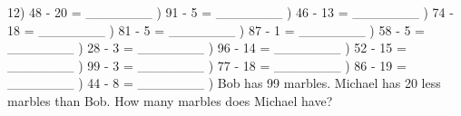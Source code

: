 \documentclass{article}%
\begin{document}
12) 48 {-} 20 = \_\_\_\_\_\_\_%
\newline%
\newline%
) 91 {-} 5 = \_\_\_\_\_\_\_%
\newline%
\newline%
) 46 {-} 13 = \_\_\_\_\_\_\_%
\newline%
\newline%
) 74 {-} 18 = \_\_\_\_\_\_\_%
\newline%
\newline%
) 81 {-} 5 = \_\_\_\_\_\_\_%
\newline%
\newline%
) 87 {-} 1 = \_\_\_\_\_\_\_%
\newline%
\newline%
) 58 {-} 5 = \_\_\_\_\_\_\_%
\newline%
\newline%
) 28 {-} 3 = \_\_\_\_\_\_\_%
\newline%
\newline%
) 96 {-} 14 = \_\_\_\_\_\_\_%
\newline%
\newline%
) 52 {-} 15 = \_\_\_\_\_\_\_%
\newline%
\newline%
) 99 {-} 3 = \_\_\_\_\_\_\_%
\newline%
\newline%
) 77 {-} 18 = \_\_\_\_\_\_\_%
\newline%
\newline%
) 86 {-} 19 = \_\_\_\_\_\_\_%
\newline%
\newline%
) 44 {-} 8 = \_\_\_\_\_\_\_%
\newline%
\newline%
) Bob has 99 marbles. Michael has 20 less marbles than Bob. How many marbles does Michael have?%
\end{document}
